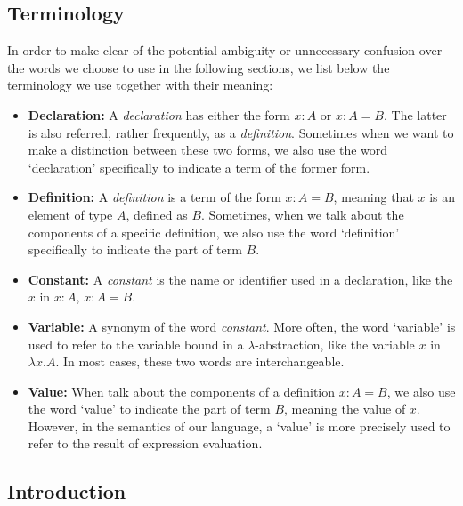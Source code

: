 \documentclass{article}
\theoremstyle{remark}
\begin{document}
\subsection{Terminology}
In order to make clear of the potential ambiguity or unnecessary confusion over the words we choose to use in the following sections, we list below the terminology we use together with their meaning:
\begin{itemize}
  \item \textbf{Declaration:} A \emph{declaration} has either the form $x : A$ or $x : A = B$. The latter is also referred, rather frequently, as a \emph{definition}. Sometimes when we want to make a distinction between these two forms, we also use the word `declaration' specifically to indicate a term of the former form. 
  \item \textbf{Definition:} A \emph{definition} is a term of the form $x : A = B$, meaning that $x$ is an element of type $A$, defined as $B$. Sometimes, when we talk about the components of a specific definition, we also use the word `definition' specifically to indicate the part of term $B$.  
  \item \textbf{Constant:} A \emph{constant} is the name or identifier used in a declaration, like the $x$ in $x : A$, $x : A = B$.
  \item \textbf{Variable:} A synonym of the word \emph{constant}. More often, the word `variable' is used to refer to the variable bound in a $\lambda$-abstraction, like the variable $x$ in $\lambda x . A$. In most cases, these two words are interchangeable. 
  \item \textbf{Value:} When talk about the components of a definition $x : A = B$, we also use the word `value' to indicate the part of term $B$, meaning the value of $x$. However, in the semantics of our language, a `value' is more precisely used to refer to the result of expression evaluation.
\end{itemize}

\subsection{Introduction}
\end{document}
